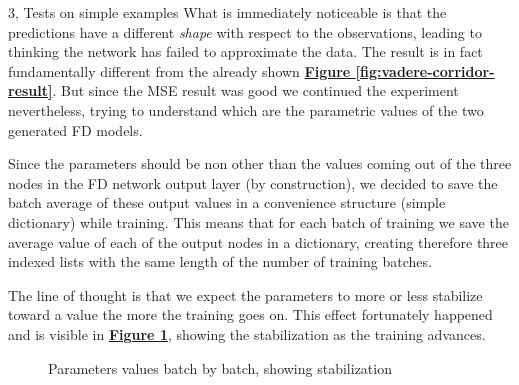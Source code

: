 \documentclass[10pt,a4paper]{article}
\begin{document}
\begin{task}{3, Tests on simple examples}
What is immediately noticeable is that the predictions have a different \textit{shape} with respect to the observations, leading to thinking the network has failed to approximate the data. The result is in fact fundamentally different from the already shown \textbf{\hyperref[fig:vadere-corridor-result]{Figure \ref{fig:vadere-corridor-result}}}. But since the MSE result was good we continued the experiment nevertheless, trying to understand which are the parametric values of the two generated FD models.

Since the parameters should be non other than the values coming out of the three nodes in the FD network output layer (by construction), we decided to save the batch average of these output values in a convenience structure (simple dictionary) while training. This means that for each batch of training we save the average value of each of the output nodes in a dictionary, creating therefore three indexed lists with the same length of the number of training batches. 

The line of thought is that we expect the parameters to more or less stabilize toward a value the more the training goes on. This effect fortunately happened and is visible in \textbf{\hyperref[fig:vadere-fd-params-batch]{Figure \ref{fig:vadere-fd-params-batch}}}, showing the stabilization as the training advances. 

\begin{figure}[h]
    \centering
    \hfill
    \caption{Parameters values batch by batch, showing stabilization}
    \label{fig:vadere-fd-params-batch}
\end{figure}


\end{task}
\end{document}
